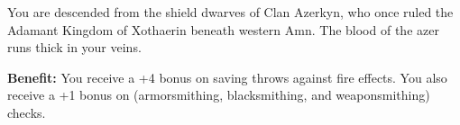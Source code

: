 
You are descended from the shield dwarves of Clan Azerkyn, who once ruled the Adamant Kingdom of Xothaerin beneath western Amn. The blood of the azer runs thick in your veins.

\textbf{Benefit:} You receive a +4 bonus on saving throws against fire effects. You also receive a +1 bonus on  (armorsmithing, blacksmithing, and weaponsmithing) checks.